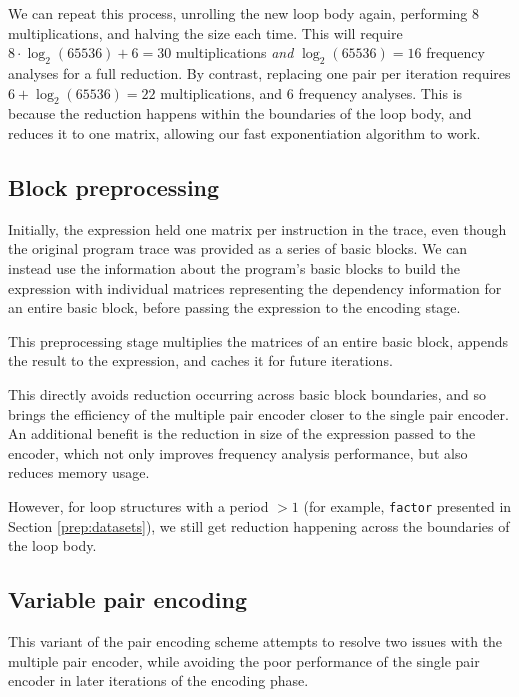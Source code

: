 We can repeat this process, unrolling the new loop body again, performing 8 multiplications,
and halving the size each time. This will require $8 \cdot \log_2(65536) + 6 = 30$ multiplications \textit{and}
$\log_2(65536) = 16$ frequency analyses for a full reduction.
By contrast, replacing one pair per iteration requires $6+\log_2(65536) = 22$ multiplications, and $6$ frequency analyses.
This is because the reduction happens within the boundaries of the loop body, and reduces it to one matrix, 
allowing our fast exponentiation algorithm to work.

\subsection{Block preprocessing} \label{impl:blocks}

Initially, the expression held one matrix per instruction in the trace, even though the original program
trace was provided as a series of basic blocks. We can instead use the information about the program's basic blocks to
build the expression with individual matrices representing the dependency information for an entire basic block, before 
passing the expression to the encoding stage.

This preprocessing stage multiplies the matrices of an entire basic block, appends the result to the expression, and 
caches it for future iterations.

This directly avoids reduction occurring across basic block boundaries, and so brings the efficiency of the multiple 
pair encoder closer to the single pair encoder. An additional benefit is the reduction in size of the expression 
passed to the encoder, which not only improves frequency analysis performance, but also reduces memory usage.

However, for loop structures with a period $>1$ (for example, \verb|factor| presented in Section \ref{prep:datasets}),
we still get reduction happening across the boundaries of the loop body.

\subsection{Variable pair encoding} \label{impl:variable-encoder}

This variant of the pair encoding scheme attempts to resolve two issues with the multiple pair encoder, while avoiding 
the poor performance of the single pair encoder in later iterations of the encoding phase.

